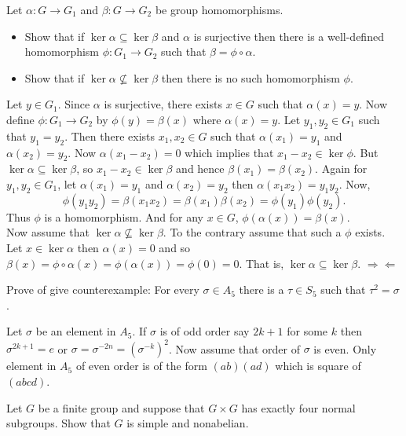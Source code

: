 \question Let $\alpha:G\to G_1$ and $\beta:G\to G_2$ be group homomorphisms.
\begin{itemize}
    \item Show that if $\ker{\alpha}\subseteq\ker{\beta}$ and $\alpha$ is surjective then there is a well-defined homomorphism $\phi:G_1\to G_2$ such that $\beta=\phi\circ\alpha$.
    \item Show that if $\ker{\alpha}\nsubseteq\ker{\beta}$ then there is no such homomorphism $\phi$.
\end{itemize}
\begin{solution}
    Let $y\in G_1$. Since $\alpha$ is surjective, there exists $x\in G$ such that $\alpha(x)=y$. Now define $\phi:G_1\to G_2$ by $\phi(y)=\beta(x)$ where $\alpha(x)=y$. Let $y_1,y_2\in G_1$ such that $y_1=y_2$. Then there exists $x_1,x_2\in G$ such that $\alpha(x_1)=y_1$ and $\alpha(x_2)=y_2$. Now $\alpha(x_1-x_2)=0$ which implies that $x_1-x_2\in\ker{\phi}$. But $\ker{\alpha}\subseteq\ker{\beta}$, so $x_1-x_2\in\ker{\beta}$ and hence $\beta(x_1)=\beta(x_2)$. Again for $y_1,y_2\in G_1$, let $\alpha(x_1)=y_1$ and $\alpha(x_2)=y_2$ then $\alpha(x_1x_2)=y_1y_2$. Now,
    $$\phi(y_1y_2)=\beta(x_1x_2)=\beta(x_1)\beta(x_2)=\phi(y_1)\phi(y_2).$$
    Thus $\phi$ is a homomorphism. And for any $x\in G$, $\phi(\alpha(x))=\beta(x)$.\\
    Now assume that $\ker{\alpha}\nsubseteq\ker{\beta}$. To the contrary assume that such a $\phi$ exists. Let $x\in\ker{\alpha}$ then $\alpha(x)=0$ and so $\beta(x)=\phi\circ\alpha(x)=\phi(\alpha(x))=\phi(0)=0$. That is, $\ker{\alpha}\subseteq\ker{\beta}$. $\Rightarrow\Leftarrow$
\end{solution}

\question Prove of give counterexample: For every $\sigma\in A_5$ there is a $\tau\in S_5$ such that $\tau^2=\sigma$.

\begin{solution}
    Let $\sigma$ be an element in $A_5$. If $\sigma$ is of odd order say $2k+1$ for some $k$ then $\sigma^{2k+1}=e$ or $\sigma=\sigma^{-2n}=(\sigma^{-k})^2$. Now assume that order of $\sigma$ is even. Only element in $A_5$ of even order is of the form $(ab)(ad)$ which is square of $(abcd)$. 
\end{solution}

\question Let $G$ be a finite group and suppose that $G\times G$ has exactly four normal subgroups. Show that $G$ is simple and nonabelian.

\begin{solution}
    
\end{solution}

